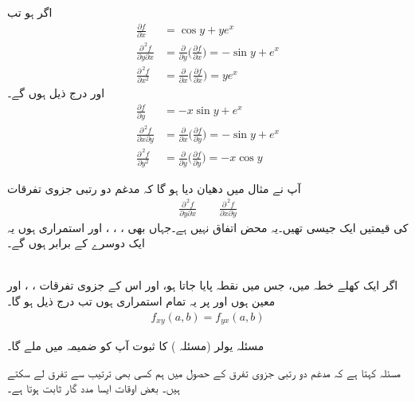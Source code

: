اگر  ہو تب
\begin{align*}
\frac{\partial f}{\partial x}&=\cos y+ye^x\\
\frac{\partial^{\,2} f}{\partial y\partial x}&=\frac{\partial}{\partial y}\big(\frac{\partial f}{\partial x}\big)=-\sin y+e^x\\
\frac{\partial^{\,2} f}{\partial x^2}&=\frac{\partial}{\partial x}\big(\frac{\partial f}{\partial x}\big)=ye^x
\end{align*}
اور  درج ذیل ہوں گے۔
\begin{align*}
\frac{\partial f}{\partial y}&=-x\sin y+e^x\\
\frac{\partial^{\,2} f}{\partial x\partial y}&=\frac{\partial}{\partial x}\big(\frac{\partial f}{\partial y}\big)=-\sin y+e^x\\
\frac{\partial^{\,2} f}{\partial y^2}&=\frac{\partial}{\partial y}\big(\frac{\partial f}{\partial y}\big)=-x\cos y
\end{align*}

آپ نے مثال  میں دھیان دیا ہو گا کہ    مدغم      دو رتبی جزوی تفرقات
\begin{align*}
\frac{\partial^{\,2}f}{\partial y\partial x}\quad \text{}\quad \frac{\partial^{\,2}f}{\partial x\partial y}
\end{align*}
 کی قیمتیں ایک جیسی تھیں۔یہ محض اتفاق نہیں ہے۔جہاں  بھی ، ، ،  اور  استمراری ہوں یہ ایک دوسرے کے برابر ہوں گے۔

\\
اگر   ایک  کھلے  خطہ میں،  جس میں نقطہ  پایا جاتا ہو،  اور اس کے جزوی تفرقات ، ،  اور  معین ہوں اور      پر یہ تمام  استمراری ہوں تب درج ذیل ہو گا۔
\begin{align}
f_{xy}(a,b)=f_{yx}(a,b)
\end{align} 

مسئلہ یولر (مسئلہ ) کا ثبوت آپ کو  ضمیمہ  میں ملے گا۔

مسئلہ  کہتا ہے کہ مدغم دو رتبی جزوی تفرق کے حصول میں ہم کسی بھی ترتیب سے تفرق لے سکتے ہیں۔ بعض اوقات ایسا مدد گار ثابت ہوتا ہے۔ 

